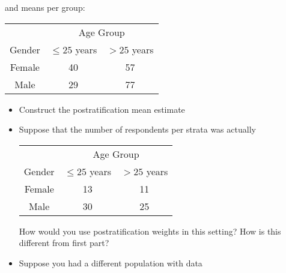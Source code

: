 \documentclass[12pt]{article}
\begin{document}
\begin{enumerate}
and means per group:

\begin{table}[!th]
\centering
\begin{tabular}{c c c}
& \multicolumn{2}{c}{Age Group} \\ \cline{2-3}
Gender & $\leq 25$ years & $> 25$ years \\ \hline
Female & 40 & 57 \\
Male & 29 & 77 \\ \hline
\end{tabular}
\end{table}

\begin{itemize}
	\item Construct the postratification mean estimate
	\item Suppose that the number of respondents per strata was actually
	\begin{table}[!th]
	\centering
	\begin{tabular}{c c c}
& \multicolumn{2}{c}{Age Group} \\ \cline{2-3}
Gender & $\leq 25$ years & $> 25$ years \\ \hline
Female & 13 & 11 \\
Male & 30 & 25 \\ \hline
\end{tabular}
\end{table}

How would you use postratification weights in this setting? How is this different from first part?
	\item Suppose you had a different population with data


\end{itemize}
\end{enumerate}
\end{document}
